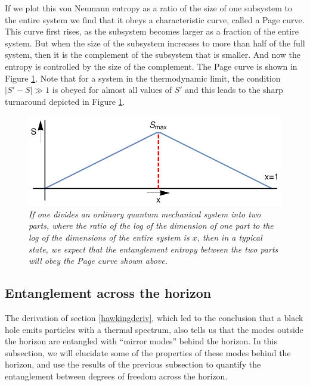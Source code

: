 \documentclass[12pt]{article}
\begin{document}
If we plot this von Neumann entropy as a ratio of the size of one subsystem to the entire system we find that it obeys a characteristic curve, called a Page curve. This curve first rises, as the subsystem becomes larger as a fraction of the entire system. But when the size of the subsystem increases to more than half of the full system, then it is the complement of the subsystem that is smaller. And now the entropy is controlled by the size of the complement.  The Page curve is shown in Figure \ref{figpage}. Note that for a system in the thermodynamic limit, the condition $|S' - S| \gg 1$ is obeyed for almost all values of $S'$ and this leads to the sharp turnaround depicted in Figure \ref{figpage}.
\begin{figure}[!ht]
\begin{center}
\includegraphics[width=\textwidth]{naivepage.pdf}
\caption{\em If one divides an ordinary quantum mechanical system into two parts, where the ratio of the log of the dimension of one part to the log of the dimensions of the  entire system is $x$, then in a typical state, we expect that the entanglement entropy between the two parts will obey the Page curve shown above. \label{figpage}}
\end{center}
\end{figure}
\subsection{Entanglement across the horizon \label{entangacrosshor}}




The derivation of section \ref{hawkingderiv}, which led to the conclusion that a black hole emits particles
with a thermal spectrum, also tells us that the modes outside the horizon are entangled with ``mirror modes''
behind the horizon.  In this subsection, we will elucidate some of the properties of these modes behind the horizon, and use the results of the previous subsection to quantify the entanglement between degrees of freedom across the horizon.
\end{document}
